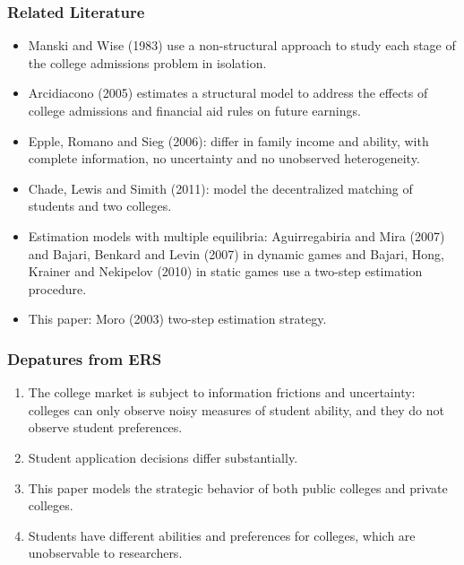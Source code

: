 \documentclass[10pt]{beamer}
\begin{document}
\begin{frame}[c]\frametitle{Related Literature}

\begin{itemize}
    \item \alert{Manski and Wise} (1983) use a non-structural approach to study each stage of the college admissions problem in isolation.
    \item \alert{Arcidiacono} (2005) estimates a structural model to address the effects of college admissions and financial aid rules on future earnings.
    \item \alert{Epple, Romano and Sieg} (2006): differ in family income and ability, with complete information, no uncertainty and no unobserved heterogeneity.
    \item \alert{Chade, Lewis and Simith} (2011): model the decentralized matching of students and two colleges.
    \item Estimation models with multiple equilibria: Aguirregabiria and Mira (2007) and Bajari, Benkard and Levin (2007) in dynamic games and Bajari, Hong, Krainer and Nekipelov (2010) in static games use a two-step estimation procedure.
    \item This paper: \alert{Moro} (2003) two-step estimation strategy.
\end{itemize}

\end{frame}

\begin{frame}[c]\frametitle{Depatures from ERS}

\begin{enumerate}
    \item The college market is subject to information frictions and uncertainty: colleges can only observe noisy measures of student ability, and they do not observe student preferences.
    \item Student application decisions differ substantially.
    \item This paper models the strategic behavior of both public colleges and private colleges.
    \item Students have different abilities and preferences for colleges, which are unobservable to researchers.
\end{enumerate}



\end{frame}
\end{document}
